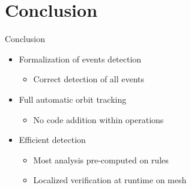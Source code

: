 \documentclass[presentation]{beamer}
\begin{document}



\section{Conclusion}
\begin{frame}{Conclusion}
	\begin{itemize}
		\item<1-> Formalization of events detection
		      \begin{itemize}
			      \item<1->  Correct detection of all events
		      \end{itemize}

		      \vspace{1em}

		\item<2-> Full automatic orbit tracking
		      \begin{itemize}
			      \item<2-> No code addition within operations
		      \end{itemize}

		      \vspace{1em}

		\item<3-> Efficient detection
		      \begin{itemize}
			      \item<3-> Most analysis pre-computed on rules
			      \item<3> Localized verification at runtime on mesh
		      \end{itemize}
	\end{itemize}
\end{frame}
\end{document}
